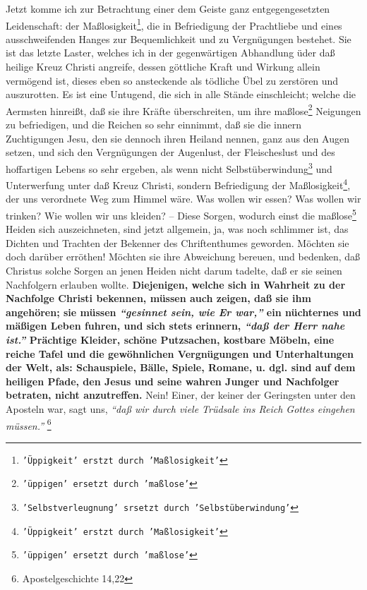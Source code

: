Jetzt komme ich zur Betrachtung einer dem Geiste ganz entgegengesetzten
Leidenschaft: der Maßlosigkeit\footnote{\texttt{'Üppigkeit' erstzt durch 'Maßlosigkeit'}}, die in Befriedigung der Prachtliebe und eines
ausschweifenden Hanges zur Bequemlichkeit und zu Vergnügungen bestehet. Sie ist
das letzte Laster, welches ich in der gegenwärtigen Abhandlung üder daß heilige
Kreuz Christi angreife, dessen göttliche Kraft und Wirkung allein vermögend ist,
dieses eben so ansteckende als tödliche Übel zu zerstören und auszurotten. Es
ist eine Untugend, die sich in alle Stände einschleicht; welche die Aermsten
hinreißt, daß sie ihre Kräfte überschreiten, um ihre maßlose\footnote{\texttt{'üppigen' ersetzt durch 'maßlose'}} Neigungen zu
befriedigen, und die Reichen so sehr einnimmt, daß sie die innern Zuchtigungen
Jesu, den sie dennoch ihren Heiland nennen, ganz aus den Augen setzen, und sich
den Vergnügungen der Augenlust, der Fleischeslust und des hoffartigen Lebens so
sehr ergeben, als wenn nicht Selbstüberwindung\footnote{\texttt{'Selbstverleugnung' srsetzt durch 'Selbstüberwindung'}}
 und Unterwerfung unter daß Kreuz
Christi, sondern Befriedigung der Maßlosigkeit\footnote{\texttt{'Üppigkeit' erstzt durch 'Maßlosigkeit'}}, der uns verordnete Weg zum Himmel
wäre. Was wollen wir essen? Was wollen wir trinken? Wie wollen wir uns kleiden?
-- Diese Sorgen, wodurch einst die maßlose\footnote{\texttt{'üppigen' ersetzt durch 'maßlose'}} Heiden sich auszeichneten, sind jetzt
allgemein, ja, was noch schlimmer ist, das Dichten und Trachten der Bekenner des
Chriftenthumes geworden. Möchten sie doch darüber erröthen! Möchten sie ihre
Abweichung bereuen, und bedenken, daß Christus solche Sorgen an jenen Heiden
nicht darum tadelte, daß er sie seinen Nachfolgern erlauben wollte. \label{ref:14_01_wahre_nachfolger} \textbf{Diejenigen,
welche sich in Wahrheit zu der Nachfolge Christi bekennen, müssen auch zeigen,
daß sie ihm angehören; sie müssen
\textit{"`gesinnet sein, wie Er war,"'} ein nüchternes
und mäßigen Leben fuhren, und sich stets erinnern,
\textit{"`daß der Herr nahe ist."'}
Prächtige Kleider, schöne Putzsachen, kostbare Möbeln, eine reiche Tafel und die
gewöhnlichen Vergnügungen und Unterhaltungen der Welt, als: Schauspiele, Bälle,
Spiele, Romane, u. dgl. sind auf dem heiligen Pfade, den Jesus und seine wahren
Junger und Nachfolger betraten, nicht anzutreffen.} Nein! Einer, der keiner der
Geringsten unter den Aposteln war, sagt uns,
\textit{"`daß wir durch viele Trüdsale ins
Reich Gottes eingehen müssen."'}
\footnote{Apostelgeschichte 14,22}

